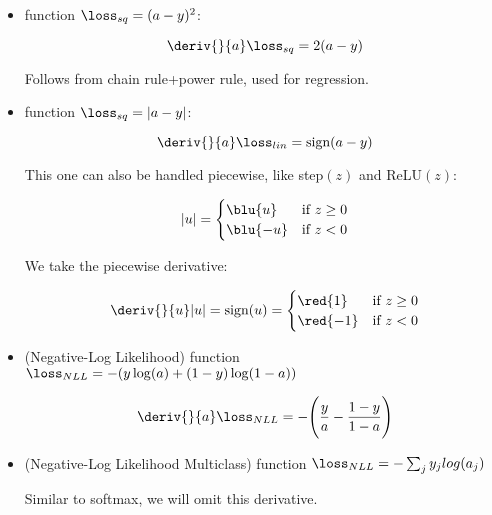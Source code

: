         \begin{itemize}
            \item {} function $\loss_{sq} = (a-y)^2$:
            
                \begin{equation}
                    \deriv{}{a} \loss_{sq} = 2(a-y)
                \end{equation}
                
                Follows from chain rule+power rule, used for regression.
                
            \item {} function $\loss_{sq} = |a-y|$:
            
                \begin{equation}
                    \deriv{}{a} \loss_{lin} = \text{sign}(a-y)
                \end{equation}
                
                This one can also be handled piecewise, like step$(z)$ and ReLU$(z)$:
                
                \begin{equation}
                    |u| 
                    =
                    \begin{cases}
                      \blu{u} & \text{if $z \geq 0$}\\
                      \blu{-u} & \text{if $z < 0$}
                    \end{cases}
                \end{equation}
                
                We take the piecewise derivative:
                
                \begin{equation}
                    \deriv{}{u}
                    |u|
                    =
                    \text{sign}(u) 
                    =
                    \begin{cases}
                      \red{1} & \text{if $z \geq 0$}\\
                      \red{-1} & \text{if $z < 0$}
                    \end{cases}
                \end{equation}
                
            \item {} (Negative-Log Likelihood) function $\loss_{NLL} = -( y \log(a) + (1-y) \log(1-a) )$
            
                \begin{equation}
                    \deriv{}{a} \loss_{NLL} = - \Bigg( \frac{y}{a} - \frac{1-y}{1-a} \Bigg)
                \end{equation}
            
            \item {} (Negative-Log Likelihood Multiclass) function $\loss_{NLL} = - \sum_j y_jlog(a_j)$
            
                Similar to softmax, we will omit this derivative.\\
        \end{itemize}
        

